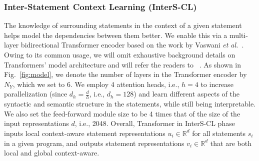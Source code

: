 

\vspace{2pt}
\subsubsection{\bf Inter-Statement Context Learning (InterS-CL)}
The knowledge of surrounding statements in the context of a given
statement helps \tool model the dependencies between them better. We
enable this via a multi-layer bidirectional Transformer encoder based
on the work by Vaswani {\em et
  al.}~\cite{Vaswani-2017}. Owing to its common usage, we will omit
exhaustive background details on Transformers' model architecture and
will refer the readers to ~\cite{Vaswani-2017}. As shown in
Fig.~\ref{fig:model}, we denote the number of layers in the
Transformer encoder by $N_Y$, which we set to 6. We employ 4 attention
heads, i.e., $h$$=$$4$ to increase parallelization (since
$d_h$$=$$\frac{d}{h}$, i.e., $d_h$$=$$128$) and learn different
aspects of the syntactic and semantic structure in the statements,
while still being interpretable. We also set the feed-forward module
size to be 4 times that of the size of the input representations $d$,
i.e., 2048. Overall, Transformer in InterS-CL phase inputs
local context-aware statement representations $u_i \in \mathbb{R}^d$
for all statements $s_i$ in a given program, and outputs statement
representations $v_i \in \mathbb{R}^d$ that are both local and global
context-aware.

